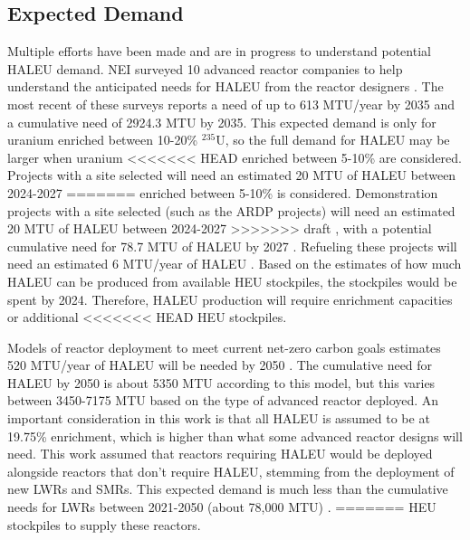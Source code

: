 \subsection{Expected Demand}
Multiple efforts have been made and are in progress to understand
potential \gls{HALEU} demand. \gls{NEI} surveyed 10 advanced reactor 
companies to help understand the anticipated needs
for \gls{HALEU} from the reactor designers 
\cite{korsnick_need_2018,korsnick_updated_2020,korsnick_updated_2021}. 
The most recent of these surveys \cite{korsnick_updated_2021} reports 
a need of up to 613 MTU/year by 2035 and a cumulative need of 2924.3 MTU 
by 2035. This expected demand is only for uranium enriched between 10-20\%
$^{235}$U, so the full demand for \gls{HALEU} may be larger when uranium 
<<<<<<< HEAD
enriched between 5-10\% are considered. Projects with a site selected 
will need an estimated 20 MTU of \gls{HALEU} between 2024-2027 
=======
enriched between 5-10\% is considered. Demonstration projects with a site selected 
(such as the \gls{ARDP} projects) will need an estimated 20 MTU of \gls{HALEU} 
between 2024-2027 
>>>>>>> draft
\cite{nuclear_energy_institute_establishing_2022}, with a potential cumulative 
need for 78.7 MTU of \gls{HALEU} by 2027 \cite{korsnick_updated_2021}. 
Refueling these projects will need an estimated 6 MTU/year of 
\gls{HALEU} \cite{nuclear_energy_institute_establishing_2022}. Based 
on the estimates of how much \gls{HALEU} can be produced from available 
\gls{HEU} stockpiles, the stockpiles would be spent by 2024. Therefore, 
\gls{HALEU} production will require enrichment capacities or additional 
<<<<<<< HEAD
\gls{HEU} stockpiles. 

Models of reactor deployment to meet current net-zero carbon goals 
estimates 520 MTU/year of \gls{HALEU} will be needed by 2050 
\cite{dixon_estimated_2022}. The cumulative need for \gls{HALEU} by 2050 
is about 5350 MTU according to this model, but this varies between 
3450-7175 MTU based on the type of advanced reactor deployed. An important 
consideration in this work is that all \gls{HALEU} is assumed to be 
at 19.75\% enrichment, which is higher than what some advanced reactor 
designs will need. This work assumed that reactors 
requiring \gls{HALEU} would be deployed alongside reactors that don't 
require \gls{HALEU}, stemming from the deployment of new 
\glspl{LWR} and \glspl{SMR}. This expected demand is much less than the 
cumulative needs for \glspl{LWR} between 2021-2050 (about 78,000 MTU) \cite{dixon_estimated_2022}. 
=======
\gls{HEU} stockpiles to supply these reactors. 

